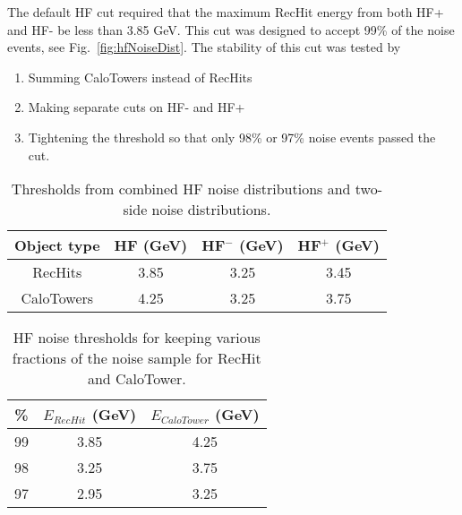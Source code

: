     \DIFaddbegin {}\DIFaddend The default HF \DIFdelbegin {}\DIFdelend \DIFaddbegin {}\DIFaddend cut required that the maximum RecHit energy
      from both HF+ and HF- be less than 3.85 GeV.
    This cut was designed to accept 99\% of the noise events, 
      see Fig.~\ref{fig:hfNoiseDist}. 
    The stability of this cut was tested by
    \begin{enumerate}
      \item Summing CaloTowers instead of RecHits
      \item Making separate cuts on HF- and HF+
      \item Tightening the threshold so that only 98\% or 97\% noise events 
        passed the cut.
    \end{enumerate}
    \begin{table}[!Hhbt]
      \centering
      \begin{tabular}{|c|c|c|c|}
        \hline
        Object type & HF (GeV) & HF$^{-}$ (GeV) & HF$^{+}$ (GeV) \\ \hline
        RecHits & 3.85 & 3.25 & 3.45 \\ \hline
        CaloTowers & 4.25 & 3.25 & 3.75 \\ \hline
      \end{tabular}
      \caption{Thresholds from combined HF noise distributions and 
        two-side noise distributions.}
      \label{tab:hfNoiseThreshAsym}
    \end{table}

    \begin{table}[!Hhbt]
      \centering
        \begin{tabular}{|c|c|c|} \hline
          \% &  $E_{RecHit}$ (GeV) & $E_{CaloTower}$ (GeV)\\ 
          \hline
          99 & 3.85& 4.25 \\ \hline
          98 & 3.25& 3.75 \\ \hline
          97 & 2.95& 3.25 \\  \hline
         \end{tabular}
        \caption{HF noise thresholds for keeping various fractions of the noise
          sample for RecHit and CaloTower.}
        \label{tab:hfAdjustedThresholds}
    \end{table}

